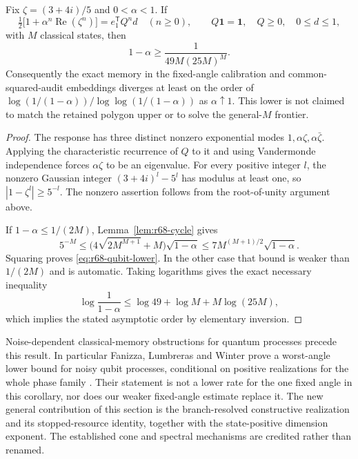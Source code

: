 \begin{corollary}\label{cor:r68-qubit-lower}
Fix $\zeta=(3+4i)/5$ and $0<\alpha<1$. If
\[
 \tfrac12\bigl[1+\alpha^n\operatorname{Re}(\zeta^n)\bigr]
           =e_1^{\mathsf T}Q^n d\quad(n\ge0),
 \qquad Q\mathbf1=\mathbf1,\quad Q\ge0,\quad 0\le d\le1,
\]
with $M$ classical states, then
\begin{equation}\label{eq:r68-qubit-lower}
 1-\alpha\ge\frac1{49M(25M)^M}.
\end{equation}
Consequently the exact memory in the fixed-angle calibration and common-squared-audit embeddings diverges at least on the order of
$\log(1/(1-\alpha))/\log\log(1/(1-\alpha))$ as $\alpha\uparrow1$. This lower is not claimed to match the retained polygon upper or to solve the general-$M$ frontier.
\end{corollary}
\begin{proof}
The response has three distinct nonzero exponential modes $1,\alpha\zeta,\alpha\bar\zeta$. Applying the characteristic recurrence of $Q$ to it and using Vandermonde independence forces $\alpha\zeta$ to be an eigenvalue. For every positive integer $l$, the nonzero Gaussian integer $(3+4i)^l-5^l$ has modulus at least one, so $|1-\zeta^l|\ge5^{-l}$. The nonzero assertion follows from the root-of-unity argument above.

If $1-\alpha\le1/(2M)$, Lemma~\ref{lem:r68-cycle} gives
\[
 5^{-M}\le\bigl(4\sqrt{2M^{M+1}}+M\bigr)\sqrt{1-\alpha}
             \le7M^{(M+1)/2}\sqrt{1-\alpha}.
\]
Squaring proves \eqref{eq:r68-qubit-lower}. In the other case that bound is weaker than $1/(2M)$ and is automatic. Taking logarithms gives the exact necessary inequality
\[
 \log\frac1{1-\alpha}\le\log49+\log M+M\log(25M),
\]
which implies the stated asymptotic order by elementary inversion.
\end{proof}

Noise-dependent classical-memory obstructions for quantum processes precede this result. In particular Fanizza, Lumbreras and Winter prove a worst-angle lower bound for noisy qubit processes, conditional on positive realizations for the whole phase family \cite{Fanizza24}. Their statement is not a lower rate for the one fixed angle in this corollary, nor does our weaker fixed-angle estimate replace it. The new general contribution of this section is the branch-resolved constructive realization and its stopped-resource identity, together with the state-positive dimension exponent. The established cone and spectral mechanisms are credited rather than renamed.
